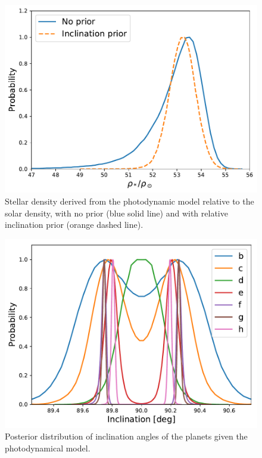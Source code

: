 \documentclass[fleqn,usenatbib]{mnras} %
\begin{document}
\begin{figure}
    \centering
    \includegraphics[width=\hsize]{figures/stellar_density_noprior.pdf}
    \caption{Stellar density derived from the photodynamic model relative to the solar density, with no prior (blue solid line) and with relative inclination prior (orange dashed line).}
    \label{fig:stellar_density}
\end{figure}

\begin{figure}
    \centering
    \includegraphics[width=\hsize]{figures/inclination_noprior.pdf}
    \caption{Posterior distribution of inclination angles of the planets given
    the photodynamical model.}
    \label{fig:inclination_distribution}
\end{figure}
\end{document}
